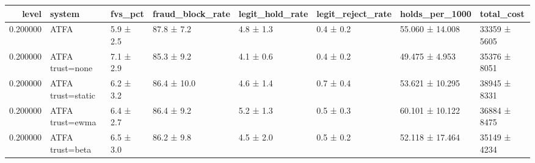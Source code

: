 \begin{tabular}{rlllllll}
\toprule
level & system & fvs\_pct & fraud\_block\_rate & legit\_hold\_rate & legit\_reject\_rate & holds\_per\_1000 & total\_cost \\
\midrule
0.200000 & ATFA & 5.9 ± 2.5 & 87.8 ± 7.2 & 4.8 ± 1.3 & 0.4 ± 0.2 & 55.060 ± 14.008 & 33359 ± 5605 \\
0.200000 & ATFA trust=none & 7.1 ± 2.9 & 85.3 ± 9.2 & 4.1 ± 0.6 & 0.4 ± 0.2 & 49.475 ± 4.953 & 35376 ± 8051 \\
0.200000 & ATFA trust=static & 6.2 ± 3.2 & 86.4 ± 10.0 & 4.6 ± 1.4 & 0.7 ± 0.4 & 53.621 ± 10.295 & 38945 ± 8331 \\
0.200000 & ATFA trust=ewma & 6.4 ± 2.7 & 86.4 ± 9.2 & 5.2 ± 1.3 & 0.5 ± 0.3 & 60.101 ± 10.122 & 36884 ± 8475 \\
0.200000 & ATFA trust=beta & 6.5 ± 3.0 & 86.2 ± 9.8 & 4.5 ± 2.0 & 0.5 ± 0.2 & 52.118 ± 17.464 & 35149 ± 4234 \\
\bottomrule
\end{tabular}
